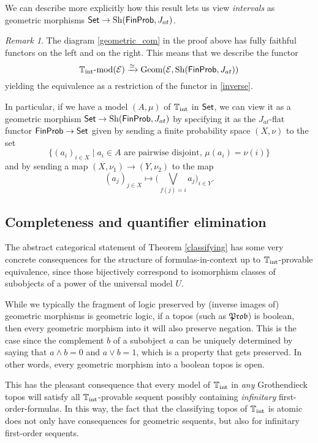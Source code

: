 \documentclass[a4paper]{amsproc}
\theoremstyle{plain}
\theoremstyle{definition}
\theoremstyle{remark}
\newtheorem{remark}[theorem]{Remark}
\numberwithin{equation}{section}
\DeclareMathOperator{\Sh}{Sh}
\DeclareMathOperator{\Geom}{Geom}
\newcommand{\Set}{\textup{\textsf{Set}}}
\newcommand{\FinProb}{\textup{\textsf{FinProb}}}
\newcommand{\Prob}{\mathfrak{Prob}}
\begin{document}
We can describe more explicitly how this result lets us view \emph{intervals} as geometric morphisms $\Set \to \Sh(\FinProb,J_{at})$.

\begin{remark} \label{classifying_equiv_data}
    The diagram \ref{geometric_com} in the proof above has fully faithful functors on the left and on the right. This means that we describe the functor
    \[
        \mathbb{T}_{\textup{int}}\textup{-mod}(\mathcal{E}) \xrightarrow{\simeq} \Geom(\mathcal{E},\Sh(\FinProb,J_{at}))
    \]
    yielding the equivalence as a restriction of the functor in \ref{inverse}.
    
    In particular, if we have a model $(A,\mu)$ of $\mathbb{T}_{\textup{int}}$ in $\Set$, we can view it as a geometric morphism $\Set \to \Sh(\FinProb, J_{at})$ by specifying it as the $J_{at}$-flat functor $\FinProb \to \Set$ given by sending a finite probability space $(X,\nu)$ to the set
    \[
    \{(a_i)_{i \in X} \mid a_i \in A \text{ are pairwise disjoint, } \mu(a_i) = \nu(i) \}
    \]
    and by sending a map $(X,\nu_1) \to (Y,\nu_2)$ to the map
    \[
    (a_j)_{j \in X} \mapsto \big (\bigvee_{f(j) = i} a_j \big )_{i \in Y} .
    \]
\end{remark}

\subsection{Completeness and quantifier elimination}

The abstract categorical statement of Theorem \ref{classifying} has some very concrete consequences for the structure of formulas-in-context up to $\mathbb{T}_{\textup{int}}$-provable equivalence, since those bijectively correspond to isomorphism classes of subobjects of a power of the universal model $U$.

While we typically the fragment of logic preserved by (inverse images of) geometric morphisms is geometric logic, if a topos (such as $\Prob$) is boolean, then every geometric morphism into it will also preserve negation. This is the case since the complement $b$ of a subobject $a$ can be uniquely determined by saying that $a \wedge b = 0$ and $a \vee b = 1$, which is a property that gets preserved. In other words, every geometric morphism into a boolean topos is open.

This has the pleasant consequence that every model of $\mathbb{T}_{\textup{int}}$ in \emph{any} Grothendieck topos will satisfy all $\mathbb{T}_{\textup{int}}$-provable sequent possibly containing \emph{infinitary} first-order-formulas. In this way, the fact that the classifying topos of $\mathbb{T}_{\textup{int}}$ is atomic does not only have consequences for geometric sequents, but also for infinitary first-order sequents.
\end{document}
